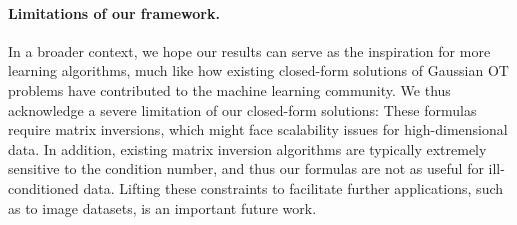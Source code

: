 \paragraph{Limitations of our framework.}
 In a broader context, we hope our results can serve as the inspiration for more learning algorithms, much like how existing closed-form solutions of Gaussian \acrshort{OT} problems have contributed to the machine learning community. We thus acknowledge a severe limitation of our closed-form solutions: These formulas require matrix inversions, which might face scalability issues for high-dimensional data. In addition, existing matrix inversion algorithms are typically extremely sensitive to the condition number, and thus our formulas are not as useful for ill-conditioned data. Lifting these constraints to facilitate further applications, such as to image datasets, is an important future work.
